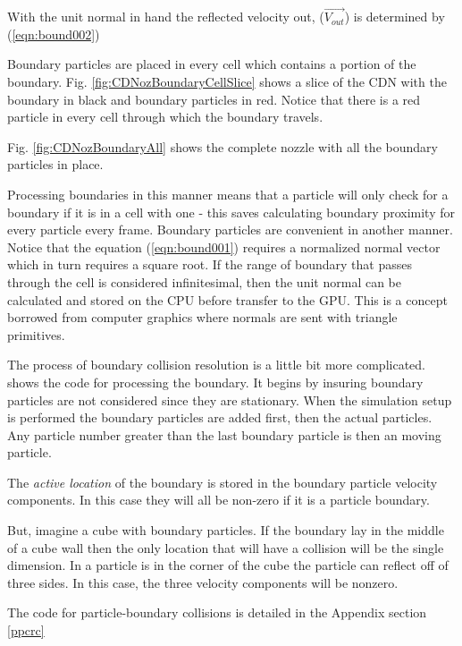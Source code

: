 With the unit normal in hand the reflected velocity out, ($\vec{V_{out}}$) is determined by (\ref{eqn:bound002}) 


Boundary particles are placed in every cell which contains a portion of the boundary. Fig. \ref{fig:CDNozBoundaryCellSlice} shows a slice of the CDN with the boundary in black and boundary particles in red. Notice that there is a red particle in every cell through which the boundary travels. 


Fig. \ref{fig:CDNozBoundaryAll} shows the complete nozzle with all the boundary particles in place.

Processing boundaries in this manner means that a particle will only check for a boundary if it is in a cell with one - this saves calculating boundary proximity for every particle every frame. 
Boundary particles are convenient in another manner. Notice that the equation (\ref{eqn:bound001}) requires a normalized normal vector which in turn requires a square root. If the range of boundary that passes through the cell is considered infinitesimal, then the unit normal can be calculated and stored on the CPU before transfer to the GPU. This is a concept borrowed from computer graphics where normals are sent with triangle primitives. 


The process of boundary collision resolution is a little bit more complicated.  shows the code for processing the boundary. It begins by insuring boundary particles are not considered since they are stationary. When the simulation setup is performed the boundary particles are added first, then the actual particles. Any particle number greater than the last boundary particle is then an moving particle. 




The \textit{active location} of the boundary is stored in the boundary particle velocity components. In this case they will all be non-zero if it is a particle boundary. 

But, imagine a cube with boundary particles. If the boundary lay in the middle of a cube wall then the only location that will have a collision will be the single dimension. In a particle is in the corner of the cube the particle can reflect off of three sides. In this case, the three velocity components will be nonzero.



The code for particle-boundary collisions is detailed in the Appendix section \ref{ppcrc}






